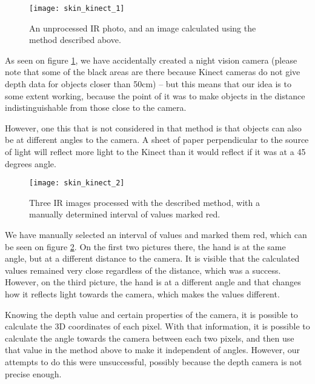             \begin{figure}[H]
                \caption{An unprocessed IR photo, and an image calculated using
                the method described above.}
                \centering
                \texttt{[image: skin\_kinect\_1]}
                \label{fig:skin_kinect_1}
            \end{figure}

            As seen on figure \ref{fig:skin_kinect_1}, we have accidentally created
            a night vision camera (please note that some of the black areas are there because Kinect cameras do not give depth data for objects closer than 50cm)
            -- but this means that our idea is to some extent working, because the point
            of it was to make objects in the distance indistinguishable from those close
            to the camera.

            However, one this that is not considered in that method is that objects
            can also be at different angles to the camera.
            A sheet of paper perpendicular to the source of light will reflect more
            light to the Kinect than it would reflect if it was at a 45 degrees angle.

            \begin{figure}[H]
                \caption{Three IR images processed with the described method, with a
                manually determined interval of values marked red.}
                \centering
                \texttt{[image: skin\_kinect\_2]}
                \label{fig:skin_kinect_2}
            \end{figure}

            We have manually selected an interval of values and marked them red, which
            can be seen on figure \ref{fig:skin_kinect_2}.
            On the first two pictures there, the hand is at the same angle, but at a
            different distance to the camera.
            It is visible that the calculated values remained very close regardless
            of the distance, which was a success.
            However, on the third picture, the hand is at a different angle and
            that changes how it reflects light towards the camera, which makes the values
            different.

            Knowing the depth value and certain properties of the camera, it is possible
            to calculate the 3D coordinates of each pixel.
            With that information, it is possible to calculate the angle towards the
            camera between each two pixels, and then use that value in the method above
            to make it independent of angles.
            However, our attempts to do this were unsuccessful, possibly because the
            depth camera is not precise enough.

